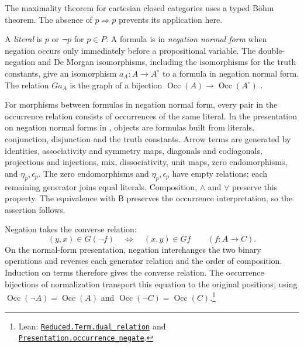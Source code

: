 \documentclass[11pt]{article}
\newcommand{\B}{\mathsf B}
\newcommand{\Occ}{\operatorname{Occ}}
\begin{document}
The maximality theorem for cartesian closed categories
\cite[\S11]{DPCCC} uses a typed B\"ohm theorem.
The absence of $p\Rightarrow p$ prevents its application here.

A \emph{literal} is $p$ or $\neg p$ for $p\in P$.
A formula is in \emph{negation normal form} when negation occurs only
immediately before a propositional variable. The double-negation and
De Morgan isomorphisms, including the isomorphisms for the truth
constants, give an isomorphism $a_A:A\to A^\circ$ to a formula in
negation normal form. The relation $Ga_A$ is the graph of a bijection
$\Occ(A)\to\Occ(A^\circ)$
\cite[\S14.1, pp.~313--315]{DP}.

For morphisms between formulas in negation normal form, every pair in
the occurrence relation consists of occurrences of the same literal.
In the presentation on negation normal forms in
\cite[\S14.2, pp.~318--321]{DP}, objects are formulas built from
literals, conjunction, disjunction and the truth constants.
Arrow terms are generated by identities, associativity and symmetry
maps, diagonals and codiagonals, projections and injections, mix,
dissociativity, unit maps, zero endomorphisms, and $\eta_p,\epsilon_p$.
The zero endomorphisms and $\eta_p,\epsilon_p$ have empty relations;
each remaining generator joins equal literals.
Composition, $\wedge$ and $\vee$ preserve this property.
The equivalence with $\B$ preserves the occurrence interpretation,
so the assertion follows.

Negation takes the converse relation:
\[
 (y,x)\in G(\neg f)\quad\Longleftrightarrow\quad(x,y)\in Gf
 \qquad(f:A\to C).
\]
On the normal-form presentation, negation interchanges the two
binary operations and reverses each generator relation and the
order of composition. Induction on terms therefore gives the
converse relation. The occurrence bijections of normalization
transport this equation to the original positions, using
$\Occ(\neg A)=\Occ(A)$ and $\Occ(\neg C)=\Occ(C)$.\footnote{\raggedright Lean:
\href{https://github.com/flengyel/Dosen-Petric-Maximality/blob/dosen-petric-v25-palomar-v3/DosenPetric/ReducedDualRelations.lean\#L20}{\texttt{Reduced.Term.\allowbreak{}dual\_relation}} and
\href{https://github.com/flengyel/Dosen-Petric-Maximality/blob/dosen-petric-v25-palomar-v3/DosenPetric/PresentationNegationOccurrence.lean\#L25}{\texttt{Presentation.\allowbreak{}occurrence\_negate}}.}
\end{document}
